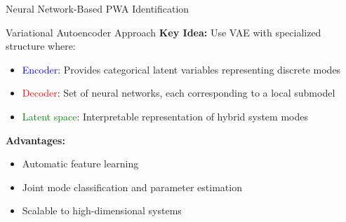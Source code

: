 \documentclass[aspectratio=169]{beamer}
\begin{document}
\begin{frame}{Neural Network-Based PWA Identification}
\begin{block}{Variational Autoencoder Approach}
\textbf{Key Idea:} Use VAE with specialized structure where:
\begin{itemize}
\item \textcolor{blue}{Encoder}: Provides categorical latent variables representing discrete modes
\item \textcolor{red}{Decoder}: Set of neural networks, each corresponding to a local submodel
\item \textcolor{green}{Latent space}: Interpretable representation of hybrid system modes
\end{itemize}
\end{block}

\begin{center}
\end{center}

\textbf{Advantages:}
\begin{itemize}
\item Automatic feature learning
\item Joint mode classification and parameter estimation
\item Scalable to high-dimensional systems
\end{itemize}
\end{frame}
\end{document}
